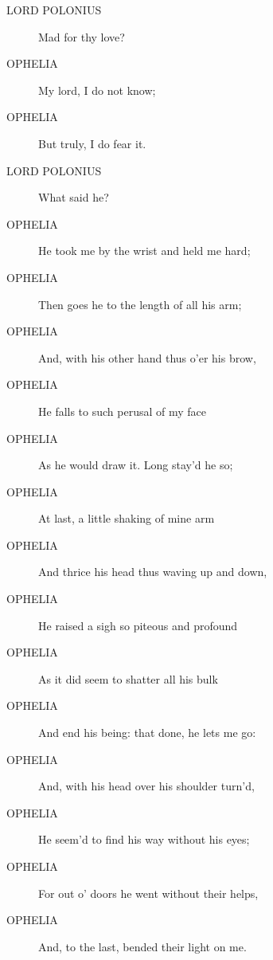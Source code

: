 \documentclass{article}
\begin{document}
\begin{description}
            
\item[LORD POLONIUS] Mad for thy love?
\end{description}
          
\begin{description}
            
\item[OPHELIA] My lord, I do not know;
\item[OPHELIA] But truly, I do fear it.
\end{description}
          
\begin{description}
            
\item[LORD POLONIUS] What said he?
\end{description}
          
\begin{description}
            
\item[OPHELIA] He took me by the wrist and held me hard;
\item[OPHELIA] Then goes he to the length of all his arm;
\item[OPHELIA] And, with his other hand thus o'er his brow,
\item[OPHELIA] He falls to such perusal of my face
\item[OPHELIA] As he would draw it. Long stay'd he so;
\item[OPHELIA] At last, a little shaking of mine arm
\item[OPHELIA] And thrice his head thus waving up and down,
\item[OPHELIA] He raised a sigh so piteous and profound
\item[OPHELIA] As it did seem to shatter all his bulk
\item[OPHELIA] And end his being: that done, he lets me go:
\item[OPHELIA] And, with his head over his shoulder turn'd,
\item[OPHELIA] He seem'd to find his way without his eyes;
\item[OPHELIA] For out o' doors he went without their helps,
\item[OPHELIA] And, to the last, bended their light on me.
\end{description}
          
\end{document}
